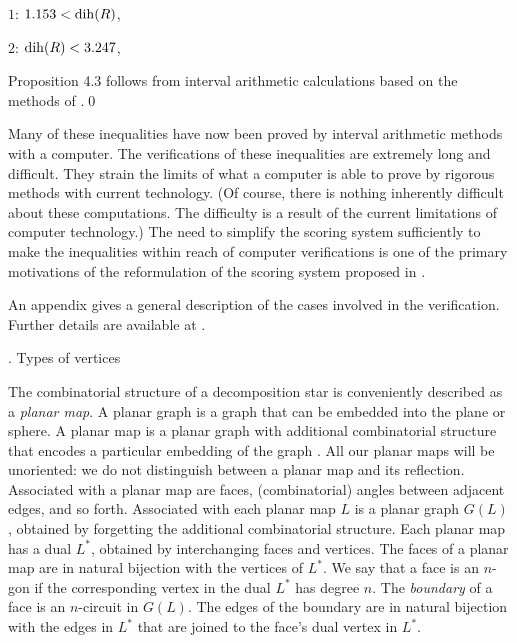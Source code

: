 \endproclaim

{\parskip=0pt
\hbox{}

$1$: \quad $1.153< \operatorname{dih}(R)$,

$2$: \quad $\operatorname{dih}(R)< 3.247$,

}

  Proposition 4.3 follows from 
interval arithmetic calculations
based on the methods of \cite{I}.\qed
\enddemo



Many of these inequalities have now been proved by 
interval arithmetic methods
with a computer.  The verifications of these inequalities are
extremely long and difficult. They strain the
limits of what a computer is able to prove by rigorous methods
with current technology.  (Of course, there is nothing inherently
difficult about these computations.  The difficulty is a result
of the current limitations of computer technology.)
The need to simplify the scoring system
sufficiently to make the inequalities within reach of computer
verifications is one of the primary motivations of the reformulation
of the scoring system proposed in \cite{F}.

An appendix gives
a general description of the cases involved in the verification.
  Further details are available at \cite{H2}.

. Types of vertices\endhead

The combinatorial structure of a decomposition star is conveniently
described as  a {\it planar map}.
A planar graph is a graph that can be embedded into the 
plane or sphere.  A planar map is a planar graph with
additional combinatorial structure that encodes a particular embedding
of the graph \cite{T}.  All our planar maps will be unoriented:
we do not distinguish between a planar map and its reflection.
Associated with a planar map are faces, (combinatorial) angles
between adjacent edges, and so forth.  Associated with each planar
map $L$ is a planar graph $G(L)$, obtained by forgetting the additional
combinatorial structure.  Each planar map has a dual $L^*$, obtained by
interchanging faces and vertices.
The faces of a planar map are in natural
bijection with the vertices of $L^*$.  We say that a face
is an $n$-gon if the corresponding vertex in the dual $L^*$ 
has degree $n$.  The {\it boundary\/} of a face is
an $n$-circuit in $G(L)$. The edges of the boundary are in natural bijection
with the edges in $L^*$ that are joined to the face's
dual vertex in $L^*$.  


